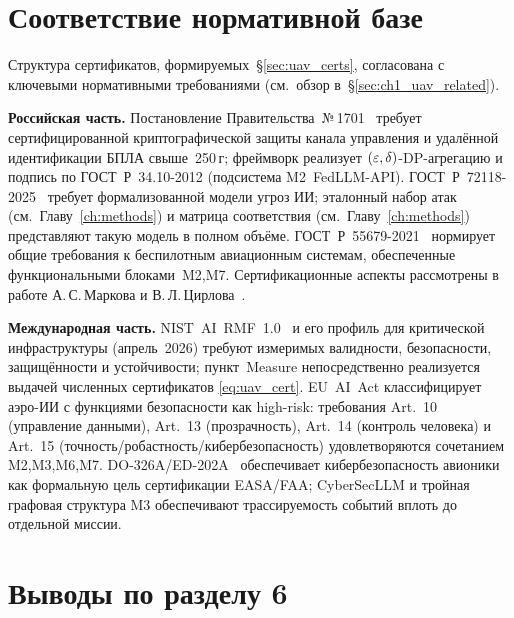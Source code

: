 \section{Соответствие нормативной базе}
\label{sec:uav_regulation}

Структура сертификатов, формируемых~\S\ref{sec:uav_certs}, согласована
с ключевыми нормативными требованиями (см.\ обзор
в~\S\ref{sec:ch1_uav_related}).

\noindent\textbf{Российская часть.}
Постановление Правительства~№\,1701~\cite{decree_1701} требует
сертифицированной криптографической защиты канала управления и
удалённой идентификации БПЛА свыше~250\,г; фреймворк реализует
$(\varepsilon,\delta)$-DP-агрегацию и подпись по \mbox{ГОСТ~Р~34.10-2012}
(подсистема \textsf{M2~FedLLM-API}).
\mbox{ГОСТ~Р~72118-2025}~\cite{GOST_R_72118_2025} требует
формализованной модели угроз ИИ; эталонный набор атак
(см.\ Главу~\ref{ch:methods}) и матрица соответствия
(см.\ Главу~\ref{ch:methods}) представляют такую модель в полном объёме.
\mbox{ГОСТ~Р~55679-2021}~\cite{GOST_R_55679_2021} нормирует общие
требования к беспилотным авиационным системам, обеспеченные
функциональными блоками~\textsf{M2,M7}. Сертификационные аспекты
рассмотрены в работе А.\,С.\,Маркова и В.\,Л.\,Цирлова~\cite{Markov2023certify}.

\noindent\textbf{Международная часть.}
\mbox{NIST~AI~RMF~1.0}~\cite{nist_rmf_2023} и его профиль для
критической инфраструктуры (апрель~2026) требуют измеримых валидности,
безопасности, защищённости и устойчивости; пункт~\textsf{Measure}
непосредственно реализуется выдачей численных сертификатов
\eqref{eq:uav_cert}. \mbox{EU~AI~Act} классифицирует аэро-ИИ с
функциями безопасности как high-risk: требования Art.~10 (управление
данными), Art.~13 (прозрачность), Art.~14 (контроль человека) и
Art.~15 (точность/робастность/кибербезопасность) удовлетворяются
сочетанием \textsf{M2,M3,M6,M7}. \mbox{DO-326A/ED-202A}~\cite{do_326a_2024}
обеспечивает кибербезопасность авионики как формальную цель
сертификации EASA/FAA; \textsf{CyberSecLLM} и тройная графовая структура
\textsf{M3} обеспечивают трассируемость событий вплоть до отдельной
миссии.

\section{Выводы по разделу 6}
\label{sec:uav_summary}

